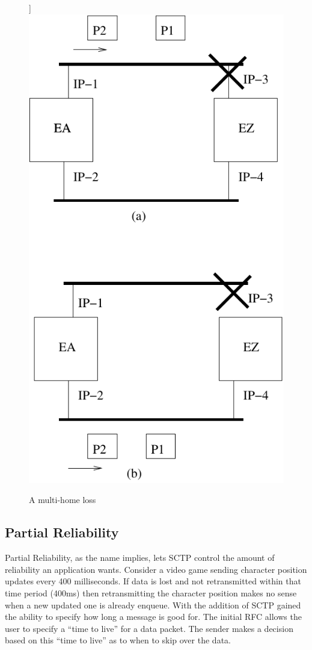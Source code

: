 \documentclass[conference]{IEEEtran}
\begin{document}
\begin{figure}]
\includegraphics{multihome}
\caption{A multi-home loss}
\label{mhomeloss}
\end{figure}


\subsection{Partial Reliability}
\label{prsctp}
Partial Reliability, as the name implies, lets SCTP control the 
amount of reliability an application wants. Consider a video
game sending character position updates every 400 milliseconds.
If data is lost and not retransmitted within that time period (400ms) then
retransmitting the character position makes no sense when a new
updated one is already enqueue. With the addition of \cite{rfc3758} SCTP
gained the ability to specify how long a message is good for.  The initial
RFC allows the user to specify a ``time to live'' for a data packet. The 
sender makes a decision based on this ``time to live'' as to when to
skip over the data. 
\end{document}
